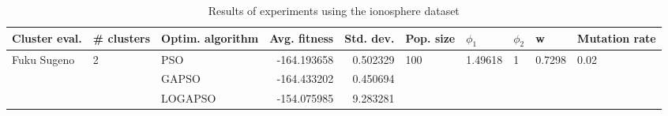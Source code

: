 \begin{table}
\centering
\caption{Results of experiments using the ionosphere dataset}
\begin{tabular}{lllrrlllll}
\toprule
               Cluster eval. &        \# clusters & Optim. algorithm &  Avg. fitness &  Std. dev. &            Pop. size &               $\phi_{1}$ &         $\phi_{2}$ &                       w &         Mutation rate \\
\midrule
\multirow{3}{*}{Fuku Sugeno} & \multirow{3}{*}{2} &              PSO &   -164.193658 &   0.502329 & \multirow{3}{*}{100} & \multirow{3}{*}{1.49618} & \multirow{3}{*}{1} & \multirow{3}{*}{0.7298} & \multirow{3}{*}{0.02} \\
                             &                    &            GAPSO &   -164.433202 &   0.450694 &                      &                          &                    &                         &                       \\
                             &                    &          LOGAPSO &   -154.075985 &   9.283281 &                      &                          &                    &                         &                       \\
\bottomrule
\end{tabular}
\end{table}
